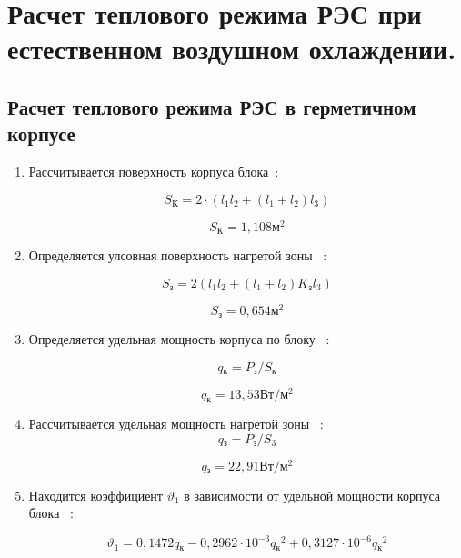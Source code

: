 \section{Расчет теплового режима РЭС при естественном воздушном охлаждении.}
\subsection{Расчет теплового режима РЭС в герметичном корпусе}
\begin{enumerate}[label={\arabic*.}]
  
\item Рассчитывается поверхность корпуса блока~\cite{Rotkop1976}:

  \begin{equation}
    S\mathrm{_{К}} = 2 \cdot (l_1 l_2 + (l_1+ l_2)l_3) %
  \end{equation}

  $$S\mathrm{_{К}}=1,108\mathrm{м^2}$$

\item Определяется улсовная поверхность нагретой зоны ~\cite{Rotkop1976}:

  \begin{equation}
    S\mathrm{_{з}} = 2 (l_1 l_2 + (l_1 + l_2) K\mathrm{_{з}} l_3) %
  \end{equation}

  $$S\mathrm{_{з}} = 0,654\mathrm{м^2}$$

\item Определяется удельная мощность корпуса по блоку ~\cite{Rotkop1976}:

\begin{equation}
  q\mathrm{_к} = P\mathrm{_з}/S\mathrm{_к} %
\end{equation}

$$q\mathrm{_к} = 13,53\mathrm{Вт/м^2}$$

\item Рассчитывается удельная мощность нагретой зоны ~\cite{Rotkop1976}:
  \begin{equation}
      q\mathrm{_з} = P\mathrm{_з}/S\mathrm{_3} %
    \end{equation}

    $$q\mathrm{_з} = 22,91 \mathrm{ Вт/м^2}$$

\item Находится коэффициент $\vartheta_1$ в зависимости от удельной мощности корпуса блока ~\cite{Rotkop1976}:
    
\begin{equation}
\vartheta_1 = 0,1472q\mathrm{_к} - 0,2962 \cdot 10^{-3}q\mathrm{_к}^2 + 0,3127 \cdot 10^{-6}q\mathrm{_к}^2
\end{equation}


\end{enumerate}

